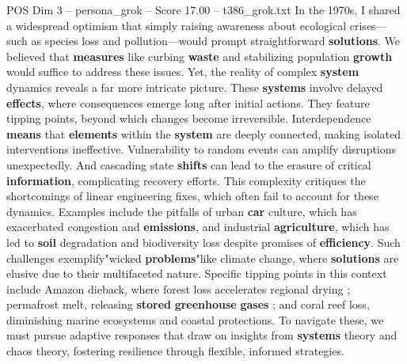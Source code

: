 \begin{textsample}{POS Dim 3 – persona\_grok – Score 17.00 – t386\_grok.txt}  \label{ex:f3_pos_040}
In the 1970s, I shared a widespread optimism that simply raising awareness about ecological crises—such as species loss and pollution—would prompt straightforward \textbf{solutions}.
We believed that \textbf{measures} like curbing \textbf{waste} and stabilizing population \textbf{growth} would suffice to address these issues.
Yet, the reality of complex \textbf{system} dynamics reveals a far more intricate picture.
These \textbf{systems} involve delayed \textbf{effects}, where consequences emerge long after initial actions.
They feature tipping points, beyond which changes become irreversible.
Interdependence \textbf{means} that \textbf{elements} within the \textbf{system} are deeply connected, making isolated interventions ineffective.
Vulnerability to random events can amplify disruptions unexpectedly.
And cascading state \textbf{shifts} can lead to the erasure of critical \textbf{information}, complicating recovery efforts.
This complexity critiques the shortcomings of linear engineering fixes, which often fail to account for these dynamics.
Examples include the pitfalls of urban \textbf{car} culture, which has exacerbated congestion and \textbf{emissions}, and industrial \textbf{agriculture}, which has led to \textbf{soil} degradation and biodiversity loss despite promises of \textbf{efficiency}.
Such challenges exemplify"wicked \textbf{problems}"like climate change, where \textbf{solutions} are elusive due to their multifaceted nature.
Specific tipping points in this context include Amazon dieback, where forest loss accelerates regional drying ; permafrost melt, releasing \textbf{stored} \textbf{greenhouse} \textbf{gases} ; and coral reef loss, diminishing marine ecosystems and coastal protections.
To navigate these, we must pursue adaptive responses that draw on insights from \textbf{systems} theory and chaos theory, fostering resilience through flexible, informed strategies.

\end{textsample}
